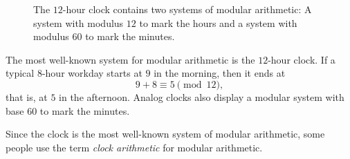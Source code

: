 \begin{figure}[t]
  \centering
  \caption[The $12$-hour clock]{The $12$-hour clock contains two systems of modular arithmetic: A system with modulus $12$ to mark the hours and a system with modulus $60$ to mark the minutes.}
  \label{figure:clock}
\end{figure}

\begin{example}
  The most well-known system for modular arithmetic is the $12$-hour clock. If a typical $8$-hour workday starts at $9$ in the morning, then it ends at
  \begin{equation*}
    9+8\equiv 5\pmod{12},
  \end{equation*}
  that is, at $5$ in the afternoon. Analog clocks also display a modular system with base $60$ to mark the minutes.

  Since the clock is the most well-known system of modular arithmetic, some people use the term \emph{clock arithmetic} for modular arithmetic.
\end{example}

